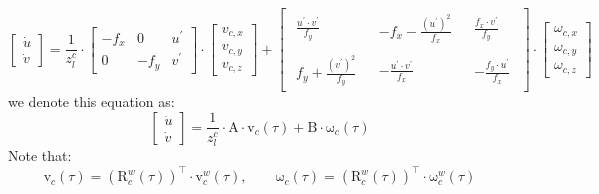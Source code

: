 \documentclass[12pt, onecolumn]{article}
\newcommand\bsm[1]{\boldsymbol{\mathrm{#1}}}
\newcommand\rotation[2]{{\bsm{R}_{#1}^{#2}}}
\newcommand\angvel[2]{{\bsm{\omega}_{#1}^{#2}}}
\newcommand\linvel[2]{{\bsm{v}_{#1}^{#2}}}
\begin{document}
\begin{equation}
	\begin{bmatrix}
			\dot{u}\\\dot{v}
		\end{bmatrix}=\frac{1}{z_l^c}\cdot\begin{bmatrix}
		-f_x&0&u^\prime\\
		0&-f_y&v^\prime
		\end{bmatrix}\cdot\begin{bmatrix}
			v_{c,x}\\
			v_{c,y}\\
			v_{c,z}
			\end{bmatrix}+\begin{bmatrix}
			\begin{aligned}
			\frac{u^\prime \cdot v^\prime}{f_y}
			\end{aligned}&
			\begin{aligned}
			-f_x-\frac{\left( u^\prime\right)^2}{f_x}
			\end{aligned}&
			\begin{aligned}
			\frac{f_x\cdot v^\prime}{f_y}
			\end{aligned}\\
			\begin{aligned}
			f_y+\frac{\left(v^\prime\right)^2}{f_y}
			\end{aligned}&
			\begin{aligned}
			-\frac{u^\prime\cdot v^\prime}{f_x}
			\end{aligned}&
			\begin{aligned}
			-\frac{f_y\cdot u^\prime}{f_x}
			\end{aligned}
			\end{bmatrix}\cdot\begin{bmatrix}
				\omega_{c,x}\\
				\omega_{c,y}\\
				\omega_{c,z}
				\end{bmatrix}
	\end{equation}
	we denote this equation as:
	\begin{equation}
	\begin{bmatrix}
				\dot{u}\\\dot{v}
			\end{bmatrix}=\frac{1}{z_l^c}\cdot\bsm{A}\cdot\bsm{v}_c(\tau)+\bsm{B}\cdot\bsm{\omega}_c(\tau)
	\end{equation}
	Note that:
	\begin{equation}
	\bsm{v}_c(\tau)=\left( \rotation{c}{w}(\tau)\right)^\top\cdot\linvel{c}{w}(\tau),\qquad
	\bsm{\omega}_c(\tau)=\left( \rotation{c}{w}(\tau)\right)^\top\cdot\angvel{c}{w}(\tau)
	\end{equation}
\end{document}
